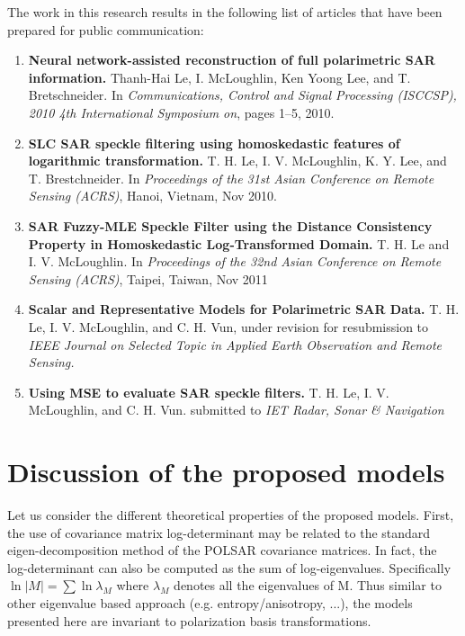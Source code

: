 The work in this research results in the following list of articles that have been prepared for public communication: 

\begin{enumerate}
\item \textbf{Neural network-assisted reconstruction of full polarimetric SAR information.}
  Thanh-Hai Le, I. McLoughlin, Ken Yoong Lee, and T. Bretschneider.
  In \textit{Communications, Control and Signal Processing (ISCCSP), 2010 4th International Symposium on}, pages 1–5, 2010.  \cite{Le_2010_ISCCSP} 
\item \textbf{SLC SAR speckle filtering using homoskedastic features of logarithmic transformation.}
  T. H. Le, I. V. McLoughlin, K. Y. Lee, and T. Brestchneider.
  In \textit{Proceedings of the 31st Asian Conference on Remote Sensing (ACRS)}, Hanoi, Vietnam, Nov 2010. \cite{Le_2010_ACRS}
\item  \textbf{SAR Fuzzy-MLE Speckle Filter using the Distance Consistency Property in Homoskedastic Log-Transformed Domain.}
  T. H. Le and I. V. McLoughlin. 
  In \textit{Proceedings of the 32nd Asian Conference on Remote Sensing (ACRS)}, Taipei, Taiwan, Nov 2011 \cite{Le_2011_ACRS}
\item \textbf{Scalar and Representative Models for Polarimetric SAR Data.}
  T. H. Le, I. V. McLoughlin, and C. H. Vun,
  under revision for resubmission to \textit{IEEE Journal on Selected Topic in Applied Earth Observation and Remote Sensing.}
  
\item \textbf{Using MSE to evaluate SAR speckle filters.}
  T. H. Le, I. V. McLoughlin, and C. H. Vun.
  submitted to \textit{IET Radar, Sonar \& Navigation}
\end{enumerate}
  
\section{Discussion of the proposed models}

Let us consider the different theoretical properties of the proposed models.
First, the use of covariance matrix log-determinant may be related to the standard eigen-decomposition method of the POLSAR covariance matrices.
In fact, the log-determinant can also be computed as the sum of log-eigenvalues.
Specifically $\ln{|M|} = \sum \ln{\lambda_M}$ where $\lambda_M$ denotes all the eigenvalues of M.
Thus similar to other eigenvalue based approach (e.g. entropy/anisotropy, ...),
  the models presented here are invariant to polarization basis transformations.


